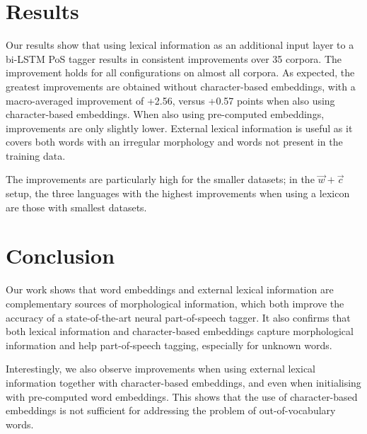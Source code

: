\documentclass[11pt,a4paper]{article}
\begin{document}
\section{Results}

Our results show that using lexical information as an additional input layer to a bi-LSTM PoS tagger results in
consistent improvements over 35 corpora. The improvement holds for all configurations on almost all corpora. As
expected, the greatest improvements are obtained without character-based embeddings, with a macro-averaged improvement
of +2.56, versus +0.57 points when also using character-based embeddings. When also using pre-computed embeddings,
improvements are only slightly lower. External lexical information is useful as it covers both words with an irregular
morphology and words not present in the training data.

The improvements are particularly high for the smaller datasets; in the $\vec{w}+\vec{c}$ setup, the three
languages with the highest improvements when using a lexicon are those with smallest datasets.





\section{Conclusion}

Our work shows that word embeddings and external lexical information are complementary sources of morphological
information, which both improve the accuracy of a state-of-the-art neural part-of-speech tagger. It also confirms that
both lexical information and character-based embeddings capture morphological information and help part-of-speech
tagging, especially for unknown words.

Interestingly, we also observe improvements when using external lexical information together with character-based
embeddings, and even when initialising with pre-computed word embeddings. This shows that the use of character-based
embeddings is not sufficient for addressing the problem of out-of-vocabulary words.
\end{document}
